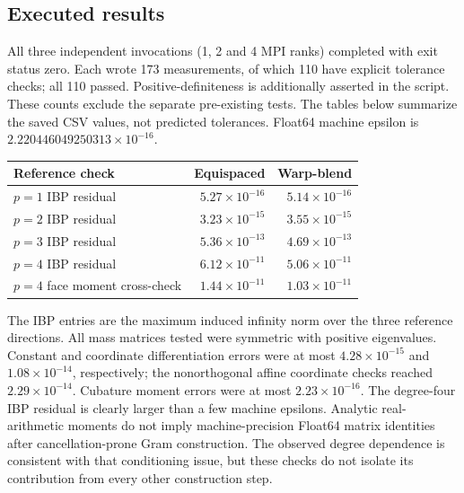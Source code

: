 \subsection{Executed results}
All three independent invocations (1, 2 and 4 MPI ranks) completed with
exit status zero. Each wrote 173 measurements, of which 110 have explicit
tolerance checks; all 110 passed. Positive-definiteness is additionally
asserted in the script. These counts exclude the separate pre-existing tests.
The tables below summarize the saved CSV values, not predicted tolerances.
Float64 machine epsilon is \(2.220446049250313\times10^{-16}\).

\begin{center}
\begin{tabular}{lrr}
\toprule
Reference check & Equispaced & Warp-blend\\\midrule
\(p=1\) IBP residual & \(5.27\times10^{-16}\) & \(5.14\times10^{-16}\)\\
\(p=2\) IBP residual & \(3.23\times10^{-15}\) & \(3.55\times10^{-15}\)\\
\(p=3\) IBP residual & \(5.36\times10^{-13}\) & \(4.69\times10^{-13}\)\\
\(p=4\) IBP residual & \(6.12\times10^{-11}\) & \(5.06\times10^{-11}\)\\
\(p=4\) face moment cross-check & \(1.44\times10^{-11}\) & \(1.03\times10^{-11}\)\\
\bottomrule
\end{tabular}
\end{center}
The IBP entries are the maximum induced infinity norm over the three
reference directions. All mass matrices tested were symmetric with positive
eigenvalues. Constant and coordinate differentiation errors were at most
\(4.28\times10^{-15}\) and \(1.08\times10^{-14}\), respectively; the
nonorthogonal affine coordinate checks reached \(2.29\times10^{-14}\).
Cubature moment errors were at most \(2.23\times10^{-16}\).
The degree-four IBP residual is clearly larger than a few machine epsilons.
Analytic real-arithmetic moments do not imply machine-precision Float64
matrix identities after cancellation-prone Gram construction. The observed
degree dependence is consistent with that conditioning issue, but these
checks do not isolate its contribution from every other construction step.

